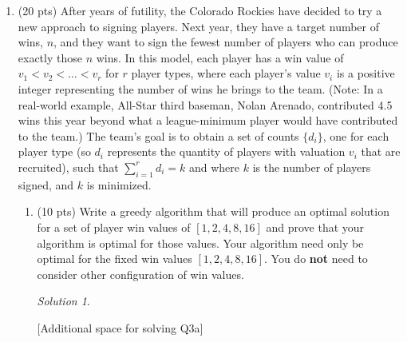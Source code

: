 \documentclass[12pt]{article}
\theoremstyle{remark}
\newtheorem*{solution}{Solution}
\begin{document}
\begin{enumerate}
\begin{center}
\end{center}
\pagebreak


\item (20 pts) After years of futility, the Colorado Rockies have decided to try a new approach to signing players. Next year, they have a target number of wins, $n$, and they want to sign the fewest number of players who can produce exactly those $n$ wins. In this model, each player has a win value of $v_{1}<v_{2}<\dots<v_{r}$ for $r$ player types, where each player's value $v_{i}$ is a positive integer representing the number of wins he brings to the team. (Note: In a real-world example, All-Star third baseman, Nolan Arenado, contributed 4.5 wins this year beyond what a league-minimum player would have contributed to the team.) 
The team's goal is to obtain a set of counts $\{d_{i}\}$, one for each player type (so $d_{i}$ represents the quantity of players with valuation $v_{i}$ that are recruited), such that $\sum_{i=1}^{r}d_{i}=k$ and where $k$ is the number of players signed, and $k$ is minimized.
	\begin{enumerate}
	\item  (10 pts) Write a greedy algorithm that will produce an optimal solution for a set of player win values of $[1, 2, 4, 8, 16]$ and prove that your algorithm is optimal for those values. Your algorithm need only be optimal for the fixed win values $[1, 2, 4, 8, 16]$. You do \textbf{not} need to consider other configuration of win values.
	\begin{solution}

    \end{solution}
    \pagebreak

[Additional space for solving Q3a]
\pagebreak


\end{enumerate}
\end{enumerate}
\end{document}
